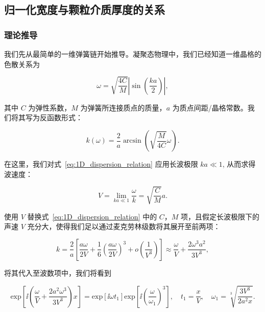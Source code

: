 \subsection{归一化宽度与颗粒介质厚度的关系}

\subsubsection{理论推导}

我们先从最简单的一维弹簧链开始推导。凝聚态物理中，我们已经知道一维晶格的色散关系为

\begin{equation}
  \omega=\sqrt{\frac{4C}{M}}\left|\sin\left(\frac{ka}{2}\right)\right|,
\end{equation}

其中 $C$ 为弹性系数，$M$ 为弹簧所连接质点的质量，$a$ 为质点间距/晶格常数。我们将其写为反函数形式：

\begin{equation}
  k(\omega) = \frac{2}{a}\arcsin{\left(\sqrt{\frac{M}{4C}}\omega\right)}.\label{eq:1D_dispersion_relation}
\end{equation}

在这里，我们对式~\eqref{eq:1D_dispersion_relation} 应用长波极限 $ka\ll 1$, 从而求得波速度：

\begin{equation}
  V = \lim_{ka\ll 1}\frac{\omega}{k} = \sqrt{\frac{C}{M}}a.
\end{equation}

使用 $V$ 替换式~\eqref{eq:1D_dispersion_relation} 中的 $C$，$M$ 项，且假定长波极限下的声速 $V$ 充分大，使得我们足以通过麦克劳林级数将其展开至前两项：

\begin{equation}
  k = \frac{2}{a}\left[\frac{a\omega}{2V} + \frac{1}{6}\left(\frac{a\omega}{2V}\right)^{3} + o\left(\frac{1}{V^3}\right)\right]\approx\frac{\omega}{V} + \frac{2\omega^{3}a^{2}}{3V^{3}},
\end{equation}

将其代入至波数项中，我们将看到

\begin{equation}
  \text{exp}\left[{\ii \left(\frac{\omega}{V} + \frac{2a^{2}\omega^{3}}{3V^{3}}\right)x}\right] = \text{exp}[{\ii\omega t_{1}}]\text{exp}\left[{\ii\left(\frac{\omega}{\omega_{1}}\right)^{3}}\right],\quad t_{1} = \frac{x}{V},\quad \omega_{1} = \sqrt[3]{\frac{3V^{3}}{2a^{2}x}}.\label{eq:rescale_method}
\end{equation}

